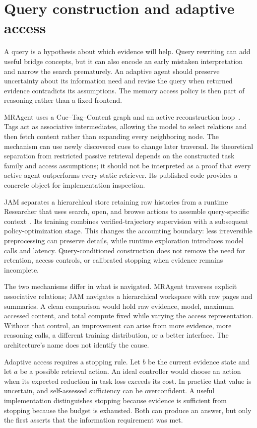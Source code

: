 \section{Query construction and adaptive access}\label{sec:C16:adaptive}
A query is a hypothesis about which evidence will help. Query rewriting can add useful bridge concepts, but it can also encode an early mistaken interpretation and narrow the search prematurely. An adaptive agent should preserve uncertainty about its information need and revise the query when returned evidence contradicts its assumptions. The memory access policy is then part of reasoning rather than a fixed frontend.

MRAgent uses a Cue--Tag--Content graph and an active reconstruction loop~\cite{mragent2026}. Tags act as associative intermediates, allowing the model to select relations and then fetch content rather than expanding every neighboring node. The mechanism can use newly discovered cues to change later traversal. Its theoretical separation from restricted passive retrieval depends on the constructed task family and access assumptions; it should not be interpreted as a proof that every active agent outperforms every static retriever. Its published code provides a concrete object for implementation inspection.

JAM separates a hierarchical store retaining raw histories from a runtime Researcher that uses search, open, and browse actions to assemble query-specific context~\cite{jit2026research}. Its training combines verified-trajectory supervision with a subsequent policy-optimization stage. This changes the accounting boundary: less irreversible preprocessing can preserve details, while runtime exploration introduces model calls and latency. Query-conditioned construction does not remove the need for retention, access controls, or calibrated stopping when evidence remains incomplete.

The two mechanisms differ in what is navigated. MRAgent traverses explicit associative relations; JAM navigates a hierarchical workspace with raw pages and summaries. A clean comparison would hold raw evidence, model, maximum accessed content, and total compute fixed while varying the access representation. Without that control, an improvement can arise from more evidence, more reasoning calls, a different training distribution, or a better interface. The architecture's name does not identify the cause.

Adaptive access requires a stopping rule. Let $b$ be the current evidence state and let $a$ be a possible retrieval action. An ideal controller would choose an action when its expected reduction in task loss exceeds its cost. In practice that value is uncertain, and self-assessed sufficiency can be overconfident. A useful implementation distinguishes stopping because evidence is sufficient from stopping because the budget is exhausted. Both can produce an answer, but only the first asserts that the information requirement was met.

